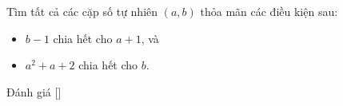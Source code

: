\ifshowproblem
\begin{problem}\label{problem:RUS-2015-TST-D9-P1}
    Tìm tất cả các cặp số tự nhiên \( (a, b) \) thỏa mãn các điều kiện sau:
    \begin{itemize}[topsep=0pt, partopsep=0pt, itemsep=0pt]
        \item \( b - 1 \) chia hết cho \( a + 1 \), và
        \item \( a^2 + a + 2 \) chia hết cho \( b \).
    \end{itemize}
\end{problem}
\fi

\ifshowinfo
Đánh giá [\textbf{}]\footnotemark
{}
\fi